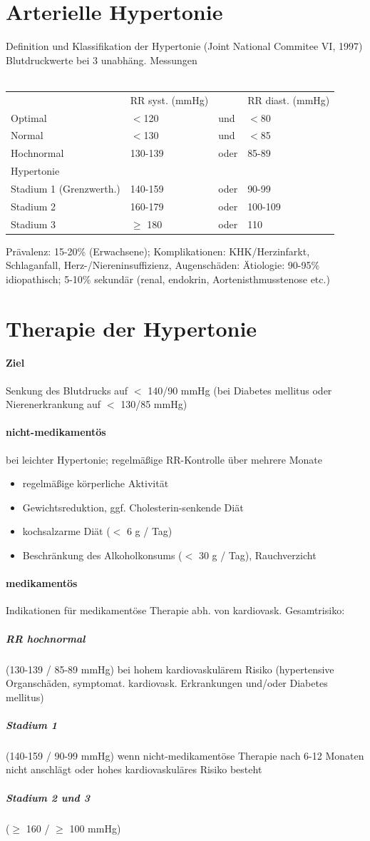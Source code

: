 \documentclass[10pt,a4paper]{report}
\begin{document}
\section{Arterielle Hypertonie}
Definition und Klassifikation der Hypertonie (Joint National Commitee VI, 1997) Blutdruckwerte bei 3 unabhäng. Messungen\\\\
\begin{tabularx}{\textwidth}{XXXX}
&RR syst. (mmHg)&&RR diast. (mmHg)\\
Optimal&$<$120&und&$<$80\\
Normal&$<$130&und&$<$85\\
Hochnormal&130-139&oder&85-89\\
Hypertonie&&&\\
Stadium 1 (Grenzwerth.)&140-159&oder&90-99\\
Stadium 2&160-179&oder&100-109\\
Stadium 3&$\geq$ 180&oder&110\\ 
\end{tabularx}
Prävalenz:  15-20\% (Erwachsene); Komplikationen: KHK/Herzinfarkt, Schlaganfall, Herz-/Niereninsuffizienz, Augenschäden: Ätiologie: 90-95\% idiopathisch; 5-10\% sekundär (renal, endokrin, Aortenisthmusstenose etc.)
\section{Therapie der Hypertonie}
\paragraph{Ziel} Senkung des Blutdrucks auf $<$ 140/90 mmHg (bei Diabetes mellitus oder Nierenerkrankung auf $<$ 130/85 mmHg)
\paragraph{nicht-medikamentös} 
bei leichter Hypertonie; regelmäßige RR-Kontrolle über mehrere Monate 
\begin{itemize}
	\item regelmäßige körperliche Aktivität
	\item Gewichtsreduktion, ggf. Cholesterin-senkende Diät
	\item kochsalzarme Diät ($<$ 6 g / Tag)
	\item Beschränkung des Alkoholkonsums ($<$ 30 g / Tag), Rauchverzicht
\end{itemize}
\paragraph{medikamentös} 
Indikationen für medikamentöse Therapie abh. von kardiovask. Gesamtrisiko:
\subparagraph{RR hochnormal} (130-139 / 85-89 mmHg)
bei hohem kardiovaskulärem Risiko (hypertensive Organschäden, symptomat. kardiovask. Erkrankungen und/oder Diabetes mellitus)
\subparagraph{Stadium 1} (140-159 / 90-99 mmHg)
	wenn nicht-medikamentöse Therapie nach 6-12 Monaten nicht anschlägt 	oder hohes kardiovaskuläres Risiko besteht
\subparagraph{Stadium 2 und 3} ($\geq$ 160 / $\geq$ 100 mmHg)
\end{document}
